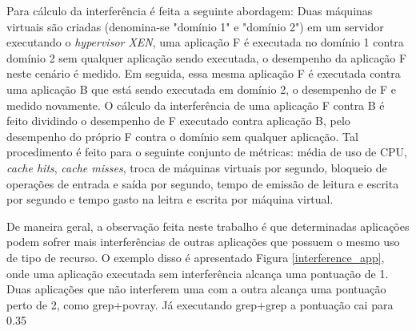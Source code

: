 Para cálculo da interferência é feita a seguinte abordagem: Duas máquinas virtuais são criadas (denomina-se "domínio 1" e "domínio 2") em um servidor executando o \textit{hypervisor XEN},  uma aplicação F é executada no domínio 1 contra domínio 2 sem qualquer aplicação sendo executada, o desempenho da aplicação F neste cenário é medido. Em seguida, essa mesma aplicação F é executada contra uma aplicação B que está sendo executada em domínio 2, o desempenho de F e medido novamente. O cálculo da interferência de uma aplicação F contra B é feito dividindo o desempenho de F executado contra aplicação B, pelo desempenho do próprio F contra o domínio sem qualquer aplicação. Tal procedimento é feito para o seguinte conjunto de métricas: média de uso de CPU, \textit{cache hits}, \textit{cache misses}, troca de máquinas virtuais por segundo, bloqueio de operações de entrada e saída por segundo, tempo de emissão de leitura e escrita por segundo e tempo gasto na leitra e escrita por máquina virtual. 

De maneira geral, a observação feita neste trabalho é que determinadas aplicações podem sofrer mais interferências de outras aplicações que possuem o mesmo uso de tipo de recurso. O exemplo disso é apresentado Figura \ref{interference_app}, onde uma aplicação executada sem interferência alcança uma pontuação de 1. Duas aplicações que não interferem uma com a outra alcança uma pontuação perto de 2, como grep+povray. Já executando grep+grep a pontuação cai para 0.35 %

